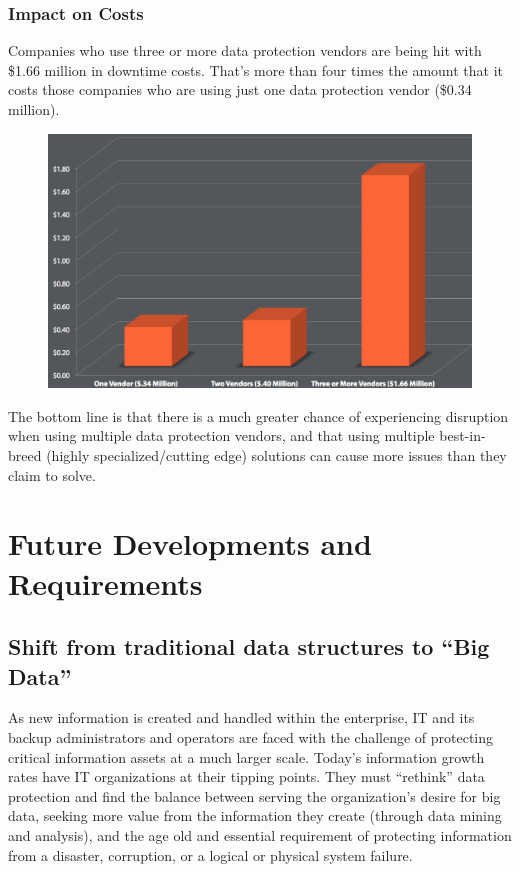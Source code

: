 \subsubsection{Impact on Costs}

Companies who use three or more data protection vendors are being hit
with \$1.66 million in downtime costs. That's more than four times the
amount that it costs those companies who are using just one data
protection vendor (\$0.34 million).


\begin{figure}[t]
    \begin{center}
        \includegraphics[scale=0.3]{images/graph2.png}
    \end{center}
    \caption{}
    \label{fig:graph2}
\end{figure}

The bottom line is that there is a much greater chance of experiencing
disruption when using multiple data protection vendors, and that using
multiple best-in-breed (highly specialized/cutting edge) solutions can
cause more issues than they claim to solve.



\section{Future Developments and Requirements}

\subsection{Shift from traditional data structures to ``Big Data''}

As new information is created and handled within the enterprise, IT and
its backup administrators and operators are faced with the challenge of
protecting critical information assets at a much larger scale. Today's
information growth rates have IT organizations at their tipping points.
They must ``rethink'' data protection and find the balance between
serving the organization's desire for big data, seeking more value from
the information they create (through data mining and analysis), and the
age old and essential requirement of protecting information from a
disaster, corruption, or a logical or physical system failure.

